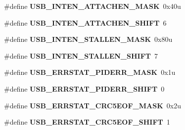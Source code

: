 \begin{DoxyCompactItemize}
\item 
\#define {\bfseries U\+S\+B\+\_\+\+I\+N\+T\+E\+N\+\_\+\+A\+T\+T\+A\+C\+H\+E\+N\+\_\+\+M\+A\+SK}~0x40u\hypertarget{group__USB__Register__Masks_gada08eb0b0c86565a19f43a0c9fbf293b}{}\label{group__USB__Register__Masks_gada08eb0b0c86565a19f43a0c9fbf293b}

\item 
\#define {\bfseries U\+S\+B\+\_\+\+I\+N\+T\+E\+N\+\_\+\+A\+T\+T\+A\+C\+H\+E\+N\+\_\+\+S\+H\+I\+FT}~6\hypertarget{group__USB__Register__Masks_ga2dcfada22ae8ed86992f14be6ab3f070}{}\label{group__USB__Register__Masks_ga2dcfada22ae8ed86992f14be6ab3f070}

\item 
\#define {\bfseries U\+S\+B\+\_\+\+I\+N\+T\+E\+N\+\_\+\+S\+T\+A\+L\+L\+E\+N\+\_\+\+M\+A\+SK}~0x80u\hypertarget{group__USB__Register__Masks_ga18443f2f26840b47e4b4088d25f51c68}{}\label{group__USB__Register__Masks_ga18443f2f26840b47e4b4088d25f51c68}

\item 
\#define {\bfseries U\+S\+B\+\_\+\+I\+N\+T\+E\+N\+\_\+\+S\+T\+A\+L\+L\+E\+N\+\_\+\+S\+H\+I\+FT}~7\hypertarget{group__USB__Register__Masks_gac8b0e5912467cf86c8a2fcc3c1e98e24}{}\label{group__USB__Register__Masks_gac8b0e5912467cf86c8a2fcc3c1e98e24}

\item 
\#define {\bfseries U\+S\+B\+\_\+\+E\+R\+R\+S\+T\+A\+T\+\_\+\+P\+I\+D\+E\+R\+R\+\_\+\+M\+A\+SK}~0x1u\hypertarget{group__USB__Register__Masks_gadf359cce923ca198235ecef76b5cc789}{}\label{group__USB__Register__Masks_gadf359cce923ca198235ecef76b5cc789}

\item 
\#define {\bfseries U\+S\+B\+\_\+\+E\+R\+R\+S\+T\+A\+T\+\_\+\+P\+I\+D\+E\+R\+R\+\_\+\+S\+H\+I\+FT}~0\hypertarget{group__USB__Register__Masks_gaf10f584ce9bbe8d7c0d0b8a6a4f61352}{}\label{group__USB__Register__Masks_gaf10f584ce9bbe8d7c0d0b8a6a4f61352}

\item 
\#define {\bfseries U\+S\+B\+\_\+\+E\+R\+R\+S\+T\+A\+T\+\_\+\+C\+R\+C5\+E\+O\+F\+\_\+\+M\+A\+SK}~0x2u\hypertarget{group__USB__Register__Masks_ga400a9d616bd8457e1003d62d62660b5a}{}\label{group__USB__Register__Masks_ga400a9d616bd8457e1003d62d62660b5a}

\item 
\#define {\bfseries U\+S\+B\+\_\+\+E\+R\+R\+S\+T\+A\+T\+\_\+\+C\+R\+C5\+E\+O\+F\+\_\+\+S\+H\+I\+FT}~1\hypertarget{group__USB__Register__Masks_ga42e986ec54195657a22043422895c708}{}\label{group__USB__Register__Masks_ga42e986ec54195657a22043422895c708}


\end{DoxyCompactItemize}
